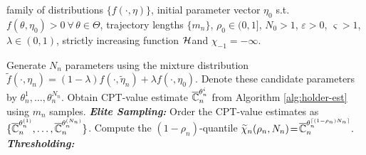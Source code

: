 \begin{algorithm}
\begin{algorithmic}
  family of distributions $\{f(\cdot,\eta)\}$, initial parameter vector $\eta_0$ s.t. $f(\theta,\eta_0)>0 ~\forall\, \theta\in \Theta$, trajectory lengths $\{m_n\}$, 
$\rho_0 \in (0,1]$, $N_0>1$,
$\varepsilon> 0$, $\varsigma>1$, $\lambda \in(0,1)$,
strictly increasing function
$\mathcal{H}\hspace*{-3pt}$ and $\chi_{-1}=-\infty$.

	    \State 
	    Generate $N_n$ parameters using the mixture distribution $\widetilde f(\cdot,\eta_n)= (1-\lambda)f(\cdot,\widetilde\eta_n)+\lambda f(\cdot,\eta_0)$. 
	    \State Denote these candidate parameters by $\theta^1_n, \ldots, \theta_n^{N_n}$.
	      \State Obtain CPT-value estimate $\overline {\mathbb{C}}_n^{\theta^i_n}$ from Algorithm \ref{alg:holder-est} using $m_n$ samples.
	      \EndFor
	  \State \textbf{\textit{Elite Sampling:}}
	  \State Order the CPT-value estimates as $\{\overline {\mathbb{C}}_n^{\theta^{(1)}_n},\ldots,\overline {\mathbb{C}}_n^{\theta^{(N_n)}_n}\}$. 
	  \State Compute the $(1-\rho_n)$-quantile $
\widetilde \chi_{n}(\rho_n,N_n) \!=\! \overline {\mathbb{C}}_n^{\theta^{\lceil(1-\rho_n)N_n \rceil}_n}.$
		  \State \textbf{\textit{Thresholding:}}
	

\end{algorithmic}
\end{algorithm}
